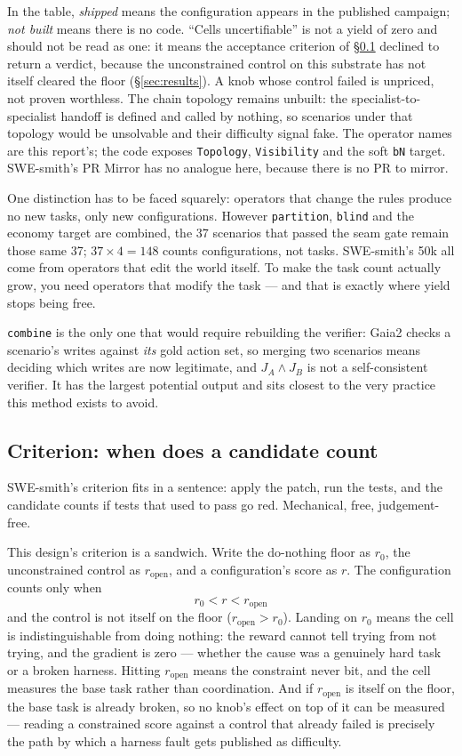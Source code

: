 \documentclass[11pt,a4paper]{article}
\begin{document}
In the table, \emph{shipped} means the configuration appears in the published campaign; \emph{not built} means there is no code. ``Cells uncertifiable'' is not a yield of zero and should not be read as one: it means the acceptance criterion of \S\ref{sec:criterion} declined to return a verdict, because the unconstrained control on this substrate has not itself cleared the floor (\S\ref{sec:results}). A knob whose control failed is unpriced, not proven worthless. The chain topology remains unbuilt: the specialist-to-specialist handoff is defined and called by nothing, so scenarios under that topology would be unsolvable and their difficulty signal fake. The operator names are this report's; the code exposes \texttt{Topology}, \texttt{Visibility} and the soft \texttt{bN} target. SWE-smith's PR Mirror has no analogue here, because there is no PR to mirror.

One distinction has to be faced squarely: operators that change the rules produce no new tasks, only new configurations. However \texttt{partition}, \texttt{blind} and the economy target are combined, the 37 scenarios that passed the seam gate remain those same 37; $37\times4=148$ counts configurations, not tasks. SWE-smith's 50k all come from operators that edit the world itself. To make the task count actually grow, you need operators that modify the task --- and that is exactly where yield stops being free.

\texttt{combine} is the only one that would require rebuilding the verifier: Gaia2 checks a scenario's writes against \emph{its} gold action set, so merging two scenarios means deciding which writes are now legitimate, and $J_A\wedge J_B$ is not a self-consistent verifier. It has the largest potential output and sits closest to the very practice this method exists to avoid.

\subsection{Criterion: when does a candidate count}
\label{sec:criterion}

SWE-smith's criterion fits in a sentence: apply the patch, run the tests, and the candidate counts if tests that used to pass go red. Mechanical, free, judgement-free.

This design's criterion is a sandwich. Write the do-nothing floor as $r_0$, the unconstrained control as $r_{\mathrm{open}}$, and a configuration's score as $r$. The configuration counts only when
\[
  r_0 < r < r_{\mathrm{open}}
\]
and the control is not itself on the floor ($r_{\mathrm{open}}>r_0$). Landing on $r_0$ means the cell is indistinguishable from doing nothing: the reward cannot tell trying from not trying, and the gradient is zero --- whether the cause was a genuinely hard task or a broken harness. Hitting $r_{\mathrm{open}}$ means the constraint never bit, and the cell measures the base task rather than coordination. And if $r_{\mathrm{open}}$ is itself on the floor, the base task is already broken, so no knob's effect on top of it can be measured --- reading a constrained score against a control that already failed is precisely the path by which a harness fault gets published as difficulty.
\end{document}
